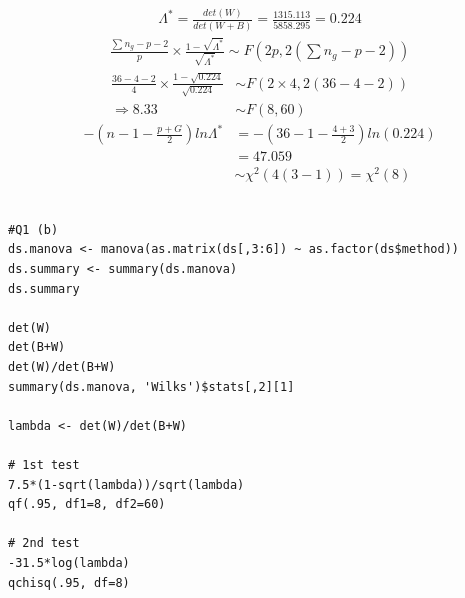\documentclass[12pt]{article}
\newenvironment{solution}[2][Solution]{\begin{trivlist}
\item[\hskip \labelsep {\bfseries #1}\hskip \labelsep {\bfseries #2.}]}{\end{trivlist}}
\begin{document}
\begin{solution}[(b) Solution] \\ 
\begin{align*}
    \Lambda^* = \frac{det(W)}{det(W+B)} = \frac{1315.113}{5858.295} = 0.224
\end{align*}
\begin{align*}
    \frac{\sum n_g -p-2}{p}\times \frac{1-\sqrt{\Lambda^*}}{\sqrt{\Lambda^*}} \sim F(2p, 2(\sum n_g -p-2))
\end{align*}
\begin{align*}
    \frac{36 -4-2}{4}\times \frac{1-\sqrt{0.224}}{\sqrt{0.224}} &\sim F(2\times 4, 2(36 -4-2))\\
    \Rightarrow  8.33 &\sim F(8, 60)
\end{align*}
\begin{align*}
    -\left( n-1-\frac{p+G}{2} \right)ln \Lambda^* &= -\left( 36-1-\frac{4+3}{2} \right)ln(0.224)\\
    &= 47.059\\
    &\sim \chi^2 (4(3-1)) = \chi^2 (8)
\end{align*}
\\
\newpage
\begin{lstlisting}[caption=R code for Q1 (b)]
#Q1 (b)
ds.manova <- manova(as.matrix(ds[,3:6]) ~ as.factor(ds$method))
ds.summary <- summary(ds.manova)
ds.summary

det(W)
det(B+W)
det(W)/det(B+W)
summary(ds.manova, 'Wilks')$stats[,2][1]

lambda <- det(W)/det(B+W)

# 1st test
7.5*(1-sqrt(lambda))/sqrt(lambda)
qf(.95, df1=8, df2=60)

# 2nd test
-31.5*log(lambda)
qchisq(.95, df=8)
\end{lstlisting}
\end{solution}
\end{document}

